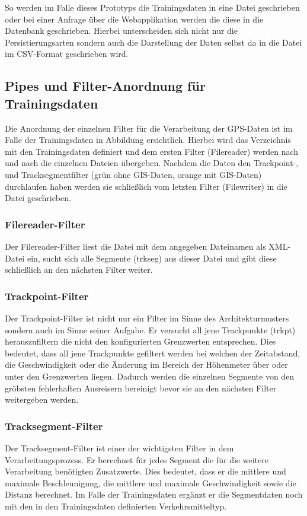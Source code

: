 So werden im Falle dieses Prototyps die Trainingsdaten in eine Datei geschrieben oder bei einer Anfrage über die Webapplikation werden die diese in die Datenbank geschrieben. Hierbei unterscheiden sich nicht nur die Persistierungsarten sondern auch die Darstellung der Daten selbst da in die Datei im CSV-Format geschrieben wird.

\subsection{Pipes und Filter-Anordnung für Trainingsdaten}
Die Anordnung der einzelnen Filter für die Verarbeitung der GPS-Daten ist im Falle der Trainingsdaten in Abbildung  ersichtlich. Hierbei wird das Verzeichnis mit den Trainingsdaten definiert und dem ersten Filter (Filereader) werden nach und nach die einzelnen Dateien übergeben. Nachdem die Daten den Trackpoint-, und Tracksegmentfilter (grün ohne GIS-Daten, orange mit GIS-Daten) durchlaufen haben werden sie schließlich vom letzten Filter (Filewriter) in die Datei geschrieben.


\subsubsection{Filereader-Filter}
Der Filereader-Filter liest die Datei mit dem angegeben Dateinamen als XML-Datei ein, sucht sich alle Segmente (trkseg) aus dieser Datei und gibt diese schließlich an den nächsten Filter weiter.

\subsubsection{Trackpoint-Filter}
Der Trackpoint-Filter ist nicht nur ein Filter im Sinne des Architekturmusters sondern auch im Sinne seiner Aufgabe. Er versucht all jene Trackpunkte (trkpt) herauszufiltern die nicht den konfigurierten Grenzwerten entsprechen. Dies bedeutet, dass all jene Trackpunkte gefiltert werden bei welchen der Zeitabstand, die Geschwindigkeit oder die Änderung im Bereich der Höhenmeter über oder unter den Grenzwerten liegen. Dadurch werden die einzelnen Segmente von den gröbsten fehlerhaften Ausreisern bereinigt bevor sie an den nächsten Filter weitergeben werden.

\subsubsection{Tracksegment-Filter}
Der Tracksegment-Filter ist einer der wichtigsten Filter in dem Verarbeitungsprozess. Er berechnet für jedes Segment die für die weitere Verarbeitung benötigten Zusatzwerte. Dies bedeutet, dass er die mittlere und maximale Beschleunigung, die mittlere und maximale Geschwindigkeit sowie die Distanz berechnet. Im Falle der Trainingsdaten ergänzt er die Segmentdaten noch mit den in den Trainingsdaten definierten Verkehrsmitteltyp.

